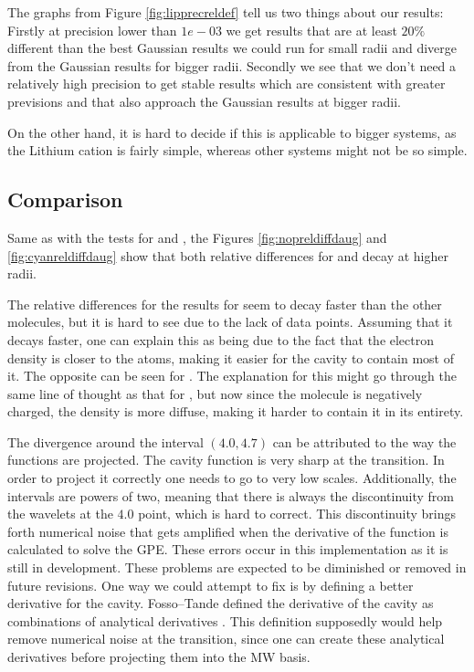 \documentclass[../Thesis.tex]{subfiles}
\begin{document}
The graphs from Figure \ref{fig:lipprecreldef} tell us two things about our results:
Firstly at precision lower than $1e-03$ we get results that are at least $20\%$ different
than the best Gaussian results we could run for small radii and diverge from the
Gaussian results for bigger radii. Secondly we see that we don't need a relatively
high precision to get stable results which are consistent with greater previsions and
that also approach the Gaussian results at bigger radii.

On the other hand, it is hard to decide if this is applicable to bigger systems,
as the Lithium cation is fairly simple, whereas
other systems might not be so simple.

\subsection{Comparison }
Same as with the tests for  and , the Figures \ref{fig:nopreldiffdaug}
and  \ref{fig:cyanreldiffdaug} show that both relative differences for 
and  decay at higher radii.

The relative differences for the results for   seem to decay faster
than the other molecules, but it
is hard to see due to the lack of data points. Assuming that it decays faster,
one can explain this as being due to the fact that the electron density is
closer to the atoms, making it easier for the cavity to contain most of it.
The opposite can be seen for . The explanation for this might go through
the same line of thought as that for , but now since the molecule is negatively
charged, the density is more diffuse, making it harder to contain it in its entirety.

The divergence around the interval $(4.0, 4.7)$ can be attributed to the way the
functions are projected. The cavity function is very sharp at the transition. In order to
project it correctly one needs to go to very low scales.
Additionally, the intervals are
powers of two, meaning that there is always the discontinuity from the wavelets at the
$4.0$ point, which is hard to correct. This discontinuity brings forth numerical
noise that gets amplified when the derivative of the function is calculated to solve the
\ac{GPE}.
These errors occur in this implementation as it is still in development. These
problems are expected to be diminished or removed in future revisions. One way we
could attempt to fix is by defining a better derivative for the cavity.
Fosso--Tande defined the derivative of the cavity as combinations of analytical
derivatives \cite{FossoTande:2013ka}. This definition supposedly would help
remove numerical noise at the transition, since one can create these analytical
derivatives before projecting them into the \ac{MW} basis.
\end{document}
